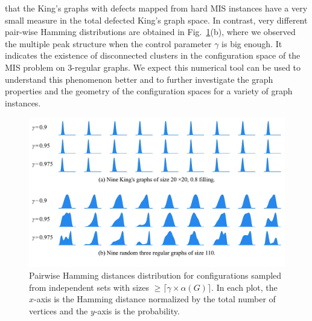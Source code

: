 \documentclass[onefignum, onetabnum]{siamart190516}
\newcommand{\<}{\langle}
\renewcommand{\>}{\rangle}
\newcommand{\Fig}[1]{Fig.~\ref{#1}}
\begin{document}
that the King's graphs with defects mapped from hard MIS instances have a very small measure in the total defected King's graph space. In contrast, 
very different pair-wise Hamming distributions are obtained in \Fig{fig:hamming}(b), where we observed the multiple peak structure when the control parameter $\gamma$ is big enough. It indicates the existence of disconnected clusters in the configuration space of the MIS problem on $3$-regular graphs.
We expect this numerical tool can be used to understand this phenomenon better and to further investigate the graph properties and the geometry of the configuration spaces for a variety of graph instances.
\begin{figure} 
    \includegraphics[width=\textwidth, trim={0.0cm 1cm 0.0cm 0cm}, clip]{figures/fig6.pdf}
    \caption{Pairwise Hamming distances distribution for configurations sampled from independent sets with sizes $\geq \lceil\gamma \times \alpha(G)\rceil$.
    In each plot, the $x$-axis is the Hamming distance normalized by the total number of vertices and the $y$-axis is the probability.
    }
    \label{fig:hamming}
\end{figure}
\end{document}
